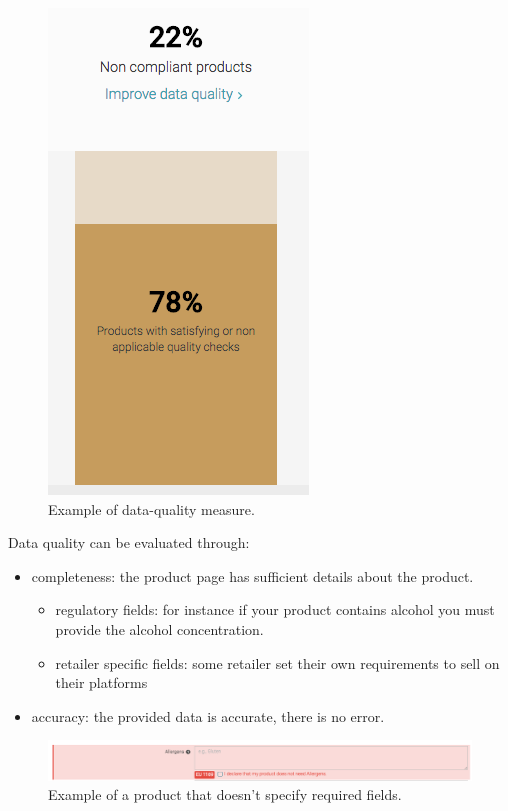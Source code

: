 \begin{figure}[H]
\centering
\includegraphics[scale=0.50]{./images/data-quality/data-quality-2.png}
\caption{Example of data-quality measure.}
\end{figure}

Data quality can be evaluated through:
\begin{itemize}
\item completeness: the product page has sufficient details about the product.
	\begin{itemize}
		\item regulatory fields: for instance if your product contains alcohol you must provide the alcohol concentration.
		\item retailer specific fields: some retailer set their own requirements to sell on their platforms
	\end{itemize}
\item accuracy: the provided data is accurate, there is no error.
\end{itemize}

\begin{figure}[H]
\centering
\includegraphics[scale=0.45]{./images/data-quality/data-quality.png}
\caption{Example of a product that doesn't specify required fields.}
\end{figure}

